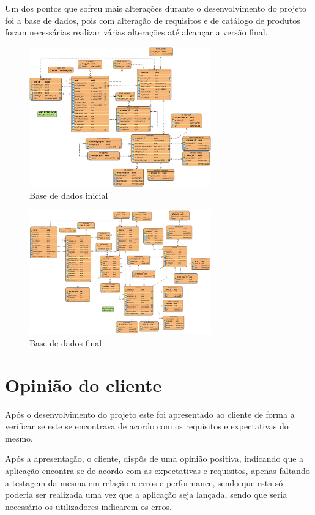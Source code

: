 Um dos pontos que sofreu mais alterações durante o desenvolvimento do projeto foi a base de dados, pois com alteração de requisitos e de catálogo de produtos foram necessárias realizar várias alterações até alcançar a versão final.

\begin{figure}[htb]
  \centering
  \includegraphics[width=0.7\textwidth]{images/diagramas/diagrama_bd.png}
  \caption{Base de dados inicial}
  \label{fig:79}
\end{figure}

\begin{figure}[htb]
  \centering
  \includegraphics[width=0.7\textwidth]{images/diagramas/bd_final.png}
  \caption{Base de dados final}
  \label{fig:80}
\end{figure}

\section{Opinião do cliente}

Após o desenvolvimento do projeto este foi apresentado ao cliente de forma a verificar se este se encontrava de acordo com os requisitos e expectativas do mesmo.

Após a apresentação, o cliente, dispôs de uma opinião positiva, indicando que a aplicação encontra-se de acordo com as expectativas e requisitos, apenas faltando a testagem da mesma em relação a erros e performance, sendo que esta só poderia ser realizada uma vez que a aplicação seja lançada, sendo que seria necessário os utilizadores indicarem os erros.